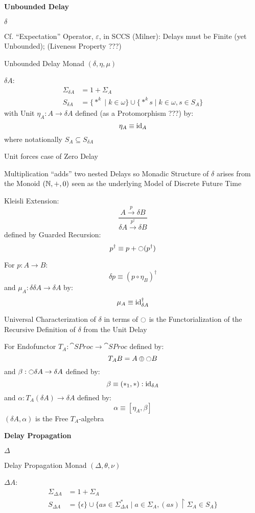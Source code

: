 \textbf{Unbounded Delay}

$\delta$

\fist Cf. ``Expectation'' Operator, $\varepsilon$, in SCCS (Milner):
Delays must be Finite (yet Unbounded); (Liveness Property ???)

Unbounded Delay Monad $(\delta, \eta, \mu)$

$\delta A$:
\begin{align*}
  \Sigma_{\delta A} &= 1 + \Sigma_A \\
  S_{\delta A} &= \{*^k \mid k \in \omega\}
    \cup \{*^k s \mid k \in \omega, s \in S_A\}
\end{align*}
with Unit $\eta_A : A \rightarrow \delta A$ defined (as a
Protomorphism ???) by:
\[
  \eta_A \equiv \mathrm{id}_A
\]
where notationally $S_A \subseteq S_{\delta A}$

Unit forces case of Zero Delay

Multiplication ``adds'' two nested Delays so Monadic Structure of
$\delta$ arises from the Monoid $(\mathbb{N},+,0)$ seen as the underlying
Model of Discrete Future Time

Kleisli Extension:
\[
  \frac{A \xrightarrow{p} \delta B}
  {\delta A \xrightarrow{p^\dag} \delta B}
\]
defined by Guarded Recursion:
\[
  p^\dag \equiv p + \ocircle(p^\dag)
\]

For $p : A \rightarrow B$:
\[
  \delta p \equiv (p \circ \eta_B)^\dag
\]
and $\mu_A : \delta \delta A \rightarrow \delta A$ by:
\[
  \mu_A \equiv \mathrm{id}_{\delta A}^\dag
\]

Universal Characterization of $\delta$ in terms of $\ocircle$ is the
Functorialization of the Recursive Definition of $\delta$ from the
Unit Delay

For Endofunctor $T_A : \cat{SProc} \rightarrow \cat{SProc}$ defined
by:
\[
  T_A B = A \oplus \ocircle B
\]
and $\beta : \ocircle \delta A \rightarrow \delta A$ defined by:
\[
  \beta \equiv (*_1,*) : \mathrm{id}_{\delta A}
\]
and $\alpha : T_A(\delta A) \rightarrow \delta A$ defined by:
\[
  \alpha \equiv [\eta_A,\beta]
\]
$(\delta A, \alpha)$ is the Free $T_A$-algebra


\textbf{Delay Propagation}

$\Delta$

Delay Propagation Monad $(\Delta,\theta,\nu)$

$\Delta A$:
\begin{align*}
  \Sigma_{\Delta A} &= 1 + \Sigma_A \\
  S_{\Delta A} &= \{\epsilon\} \cup \{as \in \Sigma_{\Delta A}^*
    \mid a \in \Sigma_A, (as) \upharpoonright \Sigma_A \in S_A\}
\end{align*}

